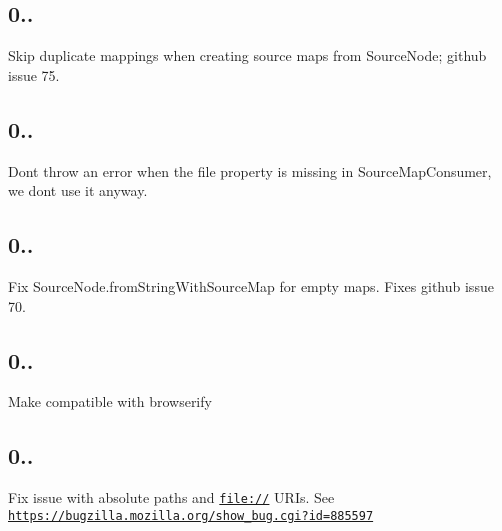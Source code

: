 \subsection*{0..}


\begin{DoxyItemize}
\item Skip duplicate mappings when creating source maps from Source\+Node; github issue 75.
\end{DoxyItemize}

\subsection*{0..}


\begin{DoxyItemize}
\item Don\textquotesingle{}t throw an error when the {\ttfamily file} property is missing in Source\+Map\+Consumer, we don\textquotesingle{}t use it anyway.
\end{DoxyItemize}

\subsection*{0..}


\begin{DoxyItemize}
\item Fix Source\+Node.\+from\+String\+With\+Source\+Map for empty maps. Fixes github issue 70.
\end{DoxyItemize}

\subsection*{0..}


\begin{DoxyItemize}
\item Make compatible with browserify
\end{DoxyItemize}

\subsection*{0..}


\begin{DoxyItemize}
\item Fix issue with absolute paths and {\ttfamily \href{file://}{\tt file\+://}} U\+R\+Is. See \href{https://bugzilla.mozilla.org/show_bug.cgi?id=885597}{\tt https\+://bugzilla.\+mozilla.\+org/show\+\_\+bug.\+cgi?id=885597}
\end{DoxyItemize}

